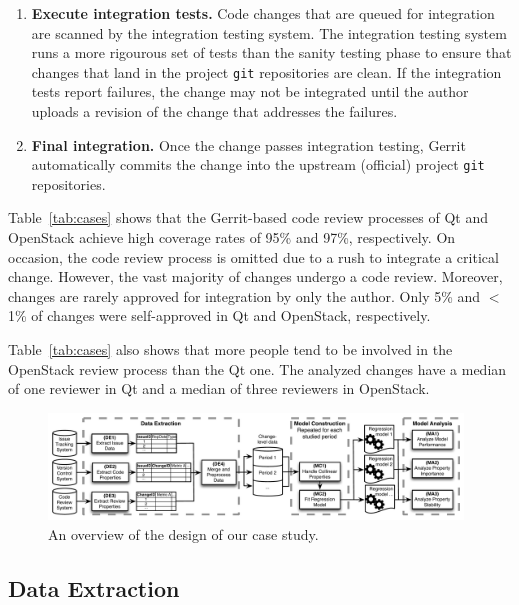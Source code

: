 \begin{enumerate}[{\bf (1)}]
    \item {\bf Execute integration tests.}
      Code changes that are queued for integration are scanned by the integration testing system.
      The integration testing system runs a more rigourous set of tests than the sanity testing phase to ensure that changes that land in the project {\tt git} repositories are clean.
      If the integration tests report failures, the change may not be integrated until the author uploads a revision of the change that addresses the failures.

    \item {\bf Final integration.}
      Once the change passes integration testing, Gerrit automatically commits the change into the upstream (official) project {\tt git} repositories.
  \end{enumerate}

  Table~\ref{tab:cases} shows that the Gerrit-based code review processes of {\sc Qt} and {\sc OpenStack} achieve high coverage rates of 95\% and 97\%, respectively.
  On occasion, the code review process is omitted due to a rush to integrate a critical change.
  However, the vast majority of changes undergo a code review.
  Moreover, changes are rarely approved for integration by only the author.
  Only 5\% and $<$1\% of changes were self-approved in {\sc Qt} and {\sc OpenStack}, respectively.

  Table~\ref{tab:cases} also shows that more people tend to be involved in the {\sc OpenStack} review process than the {\sc Qt} one.
  The analyzed changes have a median of one reviewer in {\sc Qt} and a median of three reviewers in {\sc OpenStack}.

\begin{figure}[t]
\centering
\includegraphics[width=0.98\textwidth]{figures/study_design.pdf}
\caption{An overview of the design of our case study.}
\label{fig:design}
\end{figure}



\subsection{Data Extraction}

